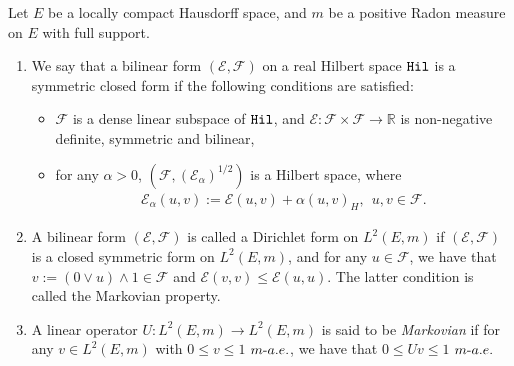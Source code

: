\documentclass[AHL,Unicode,longabstracts,published]{cedram}
\newcommand{\ce}{\mathcal{E}}
\newcommand{\cf}{\mathcal{F}}
\newcommand{\br}{\mathbb{R}}
\begin{document}
Let $E$ be a locally compact Hausdorff space, and $m$ be a positive Radon measure on $E$ with full support.


\begin{defi}\leavevmode
\begin{enumerate}
\item\label{defi3.1.1} We say that a bilinear form $(\ce,\cf)$ on a real Hilbert space ${\tt Hil}$ is a symmetric closed form if the following conditions are satisfied:
\begin{itemize}
\item$\cf$ is a dense linear subspace of ${\tt Hil}$, and $\ce:\cf\times\cf\to\br$ is non-negative definite, symmetric and bilinear,
\item for any $\alpha>0$, $(\cf,(\ce_{\alpha})^{1/2})$ is a Hilbert space, where
\begin{align*}
\ce_{\alpha}(u,v):=\ce(u,v)+\alpha(u,v)_{H},\ \ u,v\in\cf.
\end{align*}
\end{itemize}
\item\label{defi3.1.2} A bilinear form $(\ce,\cf)$ is called a Dirichlet form on $L^2(E,m)$ if $(\ce,\cf)$ is a closed symmetric form on $L^2(E,m)$, and for any $u\in\cf$, we have that $v:=(0\vee u)\wedge1\in\cf$ and $\ce(v,v)\leq\ce(u,u)$. The latter condition is called the Markovian property.
\item\label{defi3.1.3} A linear operator $U:L^2(E,m)\to L^2(E,m)$ is said to be \emph{Markovian} if for any $v\in L^2(E,m)$ with $0\leq v\leq1$ $m\mathchar`-a.e.$, we have that $0\leq Uv\leq1$ $m\mathchar`-a.e.$
\end{enumerate}
\end{defi}
\end{document}
